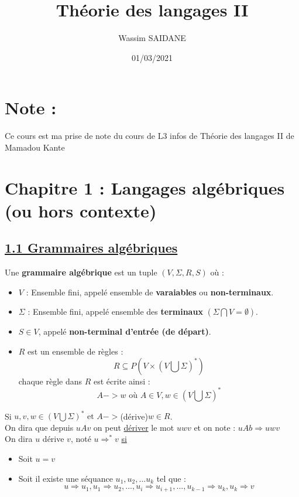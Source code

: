 \documentclass{article}
\title{Théorie des langages II}
\author{Wassim SAIDANE}
\date{01/03/2021}
\begin{document}
    \maketitle
    \section*{Note : }
    Ce cours est ma prise de note du cours de L3 infos de Théorie des langages II de Mamadou Kante
    \section*{Chapitre 1 : Langages algébriques (ou hors contexte)}
    \subsection*{\underline{1.1 Grammaires algébriques}}
    Une \textbf{grammaire algébrique} est un tuple $(V,\Sigma,R,S)$ où : \\
    \begin{itemize}
        \item $V$ : Ensemble fini, appelé ensemble de \textbf{varaiables} ou \textbf{non-terminaux}. 
        \item $\Sigma$ : Ensemble fini, appelé ensemble des \textbf{terminaux} $(\Sigma \bigcap V = \emptyset)$. 
        \item $S \in V$, appelé \textbf{non-terminal d'entrée (de départ)}. 
        \item $R$ est un ensemble de règles : \\
        \begin{equation*}
            R \subseteq P(V \times (V \bigcup \Sigma)^*)
        \end{equation*}
        chaque règle dans $R$ est écrite ainsi : 
        \begin{equation*}
            A -> w \text{         où       } A \in V, w \in (V \bigcup \Sigma)^*
        \end{equation*} 
    \end{itemize}
    Si $u,v,w \in (V \bigcup \Sigma)^* \text{  et  } A -> $\text(dérive)$ w \in R$. \\ 
    On dira que depuis $uAv$ on peut \underline{dériver} le mot $uwv$ et on note : $uAb \Longrightarrow uwv$ \\
    On dira $u$ dérive $v$, noté $u \Longrightarrow^* v$ \underline{si} 
    \begin{itemize}
        \item Soit $u=v$ 
        \item Soit il existe une séquance $u_1,u_2,...u_k$ tel que : \\
        \begin{equation*}
            u \Longrightarrow u_1, u_1 \Longrightarrow u_2, ... , u_i \Longrightarrow u_{i+1}, ... , u_{k-1} \Longrightarrow u_k, u_k \Longrightarrow v 
        \end{equation*}
    \end{itemize} 
\end{document}
